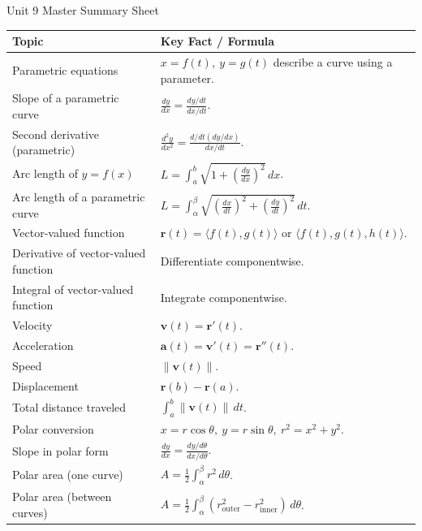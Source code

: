 \documentclass[11pt]{article}
\newcommand{\vect}[1]{\mathbf{#1}}
\begin{document}
\begin{summarybox}{Unit 9 Master Summary Sheet}
\renewcommand{\arraystretch}{1.35}
\begin{tabularx}{\textwidth}{@{}p{}X@{}}
\toprule
\textbf{Topic} & \textbf{Key Fact / Formula} \\
\midrule
Parametric equations & \(x=f(t),\ y=g(t)\) describe a curve using a parameter. \\

Slope of a parametric curve & \(\displaystyle \frac{dy}{dx}=\frac{dy/dt}{dx/dt}\). \\

Second derivative (parametric) & \(\displaystyle \frac{d^2y}{dx^2}=\frac{d/dt(dy/dx)}{dx/dt}\). \\

Arc length of \(y=f(x)\) & \(\displaystyle L=\int_a^b \sqrt{1+\left(\frac{dy}{dx}\right)^2}\,dx\). \\

Arc length of a parametric curve & \(\displaystyle L=\int_\alpha^\beta \sqrt{\left(\frac{dx}{dt}\right)^2+\left(\frac{dy}{dt}\right)^2}\,dt\). \\

Vector-valued function & \(\vect{r}(t)=\langle f(t),g(t)\rangle\) or \(\langle f(t),g(t),h(t)\rangle\). \\

Derivative of vector-valued function & Differentiate componentwise. \\

Integral of vector-valued function & Integrate componentwise. \\

Velocity & \(\vect{v}(t)=\vect{r}'(t)\). \\

Acceleration & \(\vect{a}(t)=\vect{v}'(t)=\vect{r}''(t)\). \\

Speed & \(\|\vect{v}(t)\|\). \\

Displacement & \(\vect{r}(b)-\vect{r}(a)\). \\

Total distance traveled & \(\displaystyle \int_a^b \|\vect{v}(t)\|\,dt\). \\

Polar conversion & \(x=r\cos\theta,\ y=r\sin\theta,\ r^2=x^2+y^2\). \\

Slope in polar form & \(\displaystyle \frac{dy}{dx}=\frac{dy/d\theta}{dx/d\theta}\). \\

Polar area (one curve) & \(\displaystyle A=\frac12\int_\alpha^\beta r^2\,d\theta\). \\

Polar area (between curves) & \(\displaystyle A=\frac12\int_\alpha^\beta (r_{\text{outer}}^2-r_{\text{inner}}^2)\,d\theta\). \\
\bottomrule
\end{tabularx}
\end{summarybox}
\end{document}
